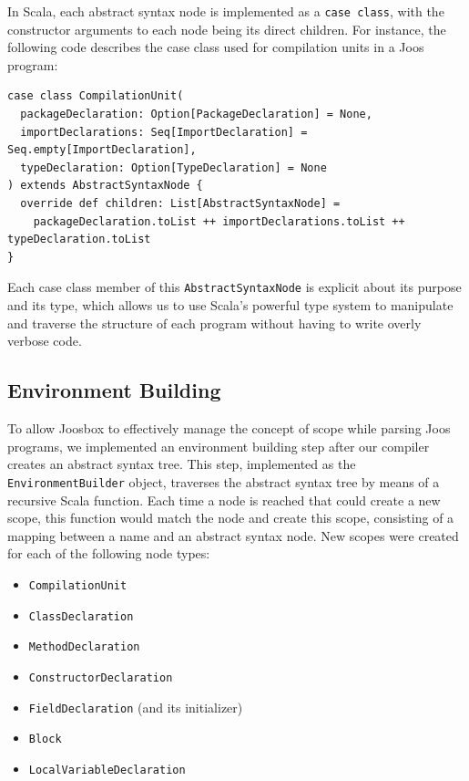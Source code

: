 \documentclass[letterpaper]{article}
\begin{document}
  In Scala, each abstract syntax node is implemented as a {\tt case class},
  with the constructor arguments to each node being its direct children.
  For instance, the following code describes the case class used for
  compilation units in a Joos program:

  \begin{verbatim}
case class CompilationUnit(
  packageDeclaration: Option[PackageDeclaration] = None,
  importDeclarations: Seq[ImportDeclaration] = Seq.empty[ImportDeclaration],
  typeDeclaration: Option[TypeDeclaration] = None
) extends AbstractSyntaxNode {
  override def children: List[AbstractSyntaxNode] =
    packageDeclaration.toList ++ importDeclarations.toList ++ typeDeclaration.toList
}
  \end{verbatim}

  Each case class member of this {\tt AbstractSyntaxNode} is explicit about
  its purpose and its type, which allows us to use Scala's powerful type
  system to manipulate and traverse the structure of each program without
  having to write overly verbose code.

  \subsection{Environment Building}

  To allow Joosbox to effectively manage the concept of scope while parsing
  Joos programs, we implemented an environment building step after our
  compiler creates an abstract syntax tree. This step, implemented as the {\tt
  EnvironmentBuilder} object, traverses the abstract syntax tree by means of a
  recursive Scala function. Each time a node is reached that could create a
  new scope, this function would match the node and create this scope,
  consisting of a mapping between a name and an abstract syntax node. New
  scopes were created for each  of the following node types:

  \begin{itemize}
    \item {\tt CompilationUnit}
    \item {\tt ClassDeclaration}
    \item {\tt MethodDeclaration}
    \item {\tt ConstructorDeclaration}
    \item {\tt FieldDeclaration} (and its initializer)
    \item {\tt Block}
    \item {\tt LocalVariableDeclaration}
  \end{itemize}
\end{document}
